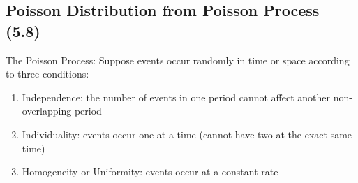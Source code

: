 \subsection{Poisson Distribution from Poisson Process (5.8)}
The Poisson Process: Suppose events occur randomly in time or space
according to three conditions:
\begin{enumerate}[(1)]
    \item Independence: the number of events in one period cannot affect another non-overlapping period
    \item Individuality: events occur one at a time (cannot have two at the exact same time)
    \item Homogeneity or Uniformity: events occur at a constant rate
\end{enumerate}